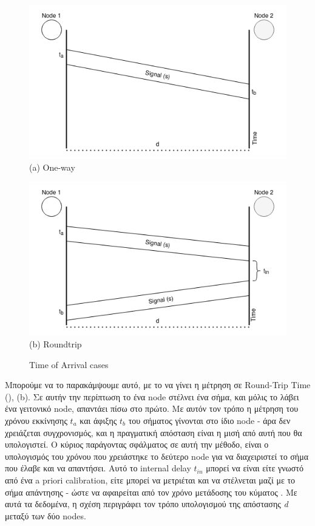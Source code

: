\begin{figure} [H]
    \centering
    \begin{minipage}{.5\textwidth}
      \centering
      \includegraphics[width=.8\linewidth]{../Photos/toa-oneway.png}\\
      {(a) One-way}
    \end{minipage}%
    \begin{minipage}{.5\textwidth}
      \centering
      \includegraphics[width=.8\linewidth]{../Photos/toa-roundtrip.png}\\
      {(b) Roundtrip}
    \end{minipage}
    \hfill \break
    \decoRule
    \caption[Time of Arrival cases]{Time of Arrival cases}
    \label{fig:Time-of-Arrival-cases}
\end{figure}

Μπορούμε να το παρακάμψουμε αυτό, με το να γίνει η μέτρηση σε Round-Trip Time (),  (b).
Σε αυτήν την περίπτωση το ένα node στέλνει ένα σήμα, και μόλις το λάβει ένα γειτονικό node, απαντάει πίσω στο πρώτο. 
Με αυτόν τον τρόπο η μέτρηση του χρόνου εκκίνησης $t_a$ και άφιξης $t_b$ του σήματος γίνονται στο ίδιο node - 
άρα δεν χρειάζεται συγχρονισμός, και η πραγματική απόσταση είναι η μισή από αυτή που θα υπολογιστεί. Ο κύριος παράγοντας
σφάλματος σε αυτή την μέθοδο, είναι ο υπολογισμός του χρόνου που χρειάστηκε το δεύτερο node για να διαχειριστεί
το σήμα που έλαβε και να απαντήσει. Αυτό το internal delay $t_{in}$ μπορεί να είναι είτε γνωστό από 
ένα a priori calibration, είτε μπορεί να μετριέται και να στέλνεται μαζί με το σήμα απάντησης - ώστε να αφαιρείται
από τον χρόνο μετάδοσης του κύματος \cite{wsn-Localization-techniques}.
Με αυτά τα δεδομένα, η σχέση  περιγράφει τον τρόπο υπολογισμού της
απόστασης \emph{d} μεταξύ των δύο nodes.


